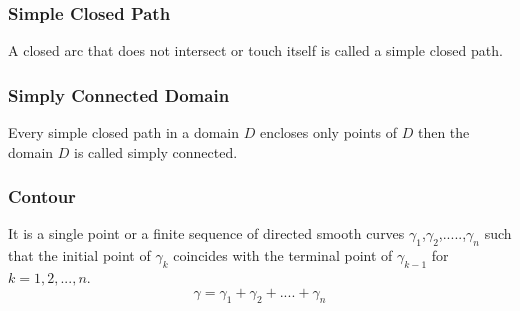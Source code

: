 \documentclass{article}
\begin{document}
\subsubsection{Simple Closed Path}
A closed arc that does not intersect or touch itself is called a simple closed path.
\subsubsection{Simply Connected Domain}
Every simple closed path in a domain $D$ encloses only points of $D$ then the domain $D$ is called simply connected.
\subsubsection{Contour}
It is a single point or a finite sequence of directed smooth curves $\gamma_1$,$\gamma_2$,.....,$\gamma_n$ such that the initial point of $\gamma_k$ coincides with the terminal point of $\gamma_{k-1}$ for $k=1,2,...,n$.
\[
\boxed{\gamma=\gamma_1+\gamma_2+....+\gamma_n}
\]
\end{document}
